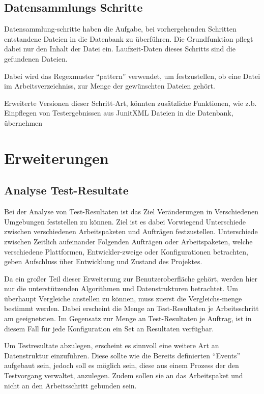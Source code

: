 \subsection{Datensammlungs Schritte}

Datensammlung-schritte haben die Aufgabe,
bei vorhergehenden Schritten entstandene Dateien 
in die Datenbank zu überführen.
Die Grundfunktion pflegt dabei nur den Inhalt der Datei ein.
Laufzeit-Daten dieses Schritts sind die gefundenen Dateien.

Dabei wird das Regexmuster ``pattern'' verwendet, um festzustellen,
ob eine Datei im Arbeitsverzeichniss, zur Menge der gewünschten Dateien gehört.

Erweiterte Versionen dieser Schritt-Art, könnten zusätzliche Funktionen,
wie z.b. Einpflegen von Testergebnissen aus JunitXML Dateien in die Datenbank,
übernehmen

\section{Erweiterungen}

\subsection{Analyse Test-Resultate}

Bei der Analyse von Test-Resultaten ist das Ziel Veränderungen in Verschiedenen Umgebungen feststellen zu können.
Ziel ist es dabei Vorwiegend Unterschiede zwischen verschiedenen Arbeitspaketen und Aufträgen festzustellen. Unterschiede zwischen Zeitlich aufeinander Folgenden Aufträgen oder Arbeitspaketen, welche verschiedene Plattformen, Entwickler-zweige oder Konfigurationen betrachten, geben Aufschluss über Entwicklung und Zustand des Projektes.

Da ein großer Teil dieser Erweiterung zur Benutzeroberfläche gehört,
werden hier nur die unterstützenden Algorithmen und Datenstrukturen betrachtet.
Um überhaupt Vergleiche anstellen zu können, muss zuerst die Vergleichs-menge bestimmt werden. Dabei erscheint die Menge an Test-Resultaten je Arbeitsschritt am geeignetsten. Im Gegensatz zur Menge an Test-Resultaten je Auftrag,
ist in diesem Fall für jede Konfiguration ein Set an Resultaten verfügbar.

Um Testresultate abzulegen, erscheint es sinnvoll eine weitere Art an Datenstruktur einzuführen.
Diese sollte wie die Bereits definierten ``Events'' aufgebaut sein,
jedoch soll es möglich sein, diese aus einem Prozess der den Testvorgang verwaltet,
anzulegen. Zudem sollen sie an das Arbeitspaket und nicht an den Arbeitsschritt gebunden sein.

